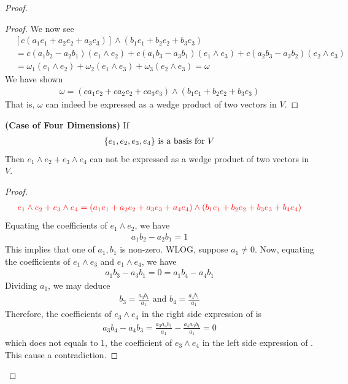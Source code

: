 \documentclass{report}
\begin{document}
\begin{proof}
\begin{proof}
We now see 
\begin{align*}
  &[c(a_1e_1+a_2e_2+a_3e_3)]\wedge  (b_1e_1+b_2e_2+b_3e_3)\\
  &= c (a_1b_2-a_2b_1) (e_1 \wedge  e_2) + c(a_1b_3 -a_3b_1)(e_1 \wedge  e_3 )+ c(a_2b_3 -a_3b_2)(e_2\wedge  e_3 ) \\
  &=\omega_1 (e_1 \wedge  e_2 )+ \omega_2 (e_1 \wedge  e_3 )+ \omega_3(e_2\wedge  e_3)=\omega
\end{align*}
We have shown 
\begin{align*}
\omega= (ca_1e_2+ca_2e_2+ca_3e_3)\wedge (b_1e_1+b_2e_2+b_3e_3) 
\end{align*}
That is, $\omega$ can indeed be expressed as a wedge product of two vectors in $V$. 

\end{proof}
\begin{theorem}
\textbf{(Case of Four Dimensions)} If 
\begin{align*}
\{ e_1,e_2,e_3,e_4 \}\text{ is a basis for }V
\end{align*}
Then $e_1 \wedge  e_2 +e_3 \wedge  e_4 $ can not be expressed as a wedge product of two vectors in $V$. 
\end{theorem}
\begin{proof}
 \begin{align}
\label{gi}
 \textcolor{red}{e_1 \wedge  e_2 + e_3 \wedge  e_4  = (a_1e_1+a_2e_2+a_3e_3+a_4e_4) \wedge  (b_1e_1+b_2e_2+b_3e_3+b_4e_4)}
\end{align}
Equating the coefficients of $e_1 \wedge  e_2$, we have  
\begin{align*}
  a_1b_2-a_2b_1 =1
\end{align*}
This implies that one of $a_1,b_1$ is non-zero. WLOG, suppose  $a_1\neq 0$. Now, equating the coefficients of $e_1 \wedge  e_3$ and $e_1 \wedge  e_4$, we have 
\begin{align*}
a_1b_3-a_3b_1=0=a_1b_4-a_4b_1
\end{align*}
Dividing $a_1$, we may deduce 
 \begin{align*}
b_3= \frac{a_3b_1}{a_1} \text{ and }b_4= \frac{a_4b_1}{a_1}
\end{align*}
Therefore, the coefficients of $e_3 \wedge  e_4$ in the right side expression of  is 
\begin{align*}
a_3b_4-a_4b_3= \frac{a_3a_4b_1}{a_1}- \frac{a_4a_3b_1}{a_1}=0
\end{align*}
which does not equals to $1$, the coefficient of $e_3 \wedge  e_4$ in the left side expression of . This cause a contradiction. 

\end{proof}
\end{proof}
\end{document}
